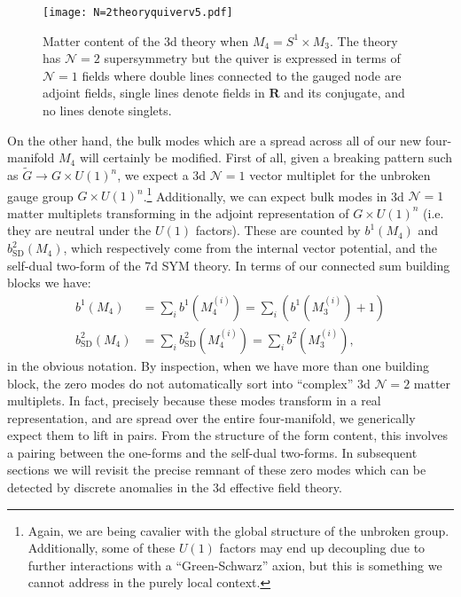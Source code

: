 \documentclass[12pt]{article}%
\numberwithin{equation}{section}
\renewcommand{\(}{\left(}
\renewcommand{\)}{\right)}
\renewcommand{\[}{\left[}
\renewcommand{\]}{\right]}
\begin{document}
\begin{figure}
\centering
\texttt{[image: N=2theoryquiverv5.pdf]}
\caption{Matter content of the 3d theory when $M_4=S^1 \times M_3$. The theory has $\mathcal{N}=2$ supersymmetry but the quiver is expressed in terms of $\mathcal{N}=1$ fields where double lines connected to the gauged node are adjoint fields, single lines denote fields in $\mathbf{R}$ and its conjugate, and no lines denote singlets.}
\label{fig:k=1}
\end{figure}



On the other hand, the bulk modes which are a spread across all of our new four-manifold $M_4$ will certainly be modified. First of all, given a breaking pattern such as $\widetilde{G} \rightarrow G \times U(1)^n $, we expect a 3d $\mathcal{N} = 1$ vector multiplet for the unbroken gauge group $G \times U(1)^n$.\footnote{Again, we are being cavalier with the global structure of the unbroken group. Additionally, some of these $U(1)$ factors may end up decoupling due to further interactions with a ``Green-Schwarz'' axion, but this is something we cannot address in the purely local context.} Additionally, we can expect bulk modes in 3d $\mathcal{N} = 1$ matter multiplets transforming in the adjoint representation of $G \times U(1)^n$ (i.e. they are neutral under the $U(1)$ factors). These are counted by $b^{1}(M_4)$ and $b^{2}_{\mathrm{SD}}(M_4)$, which respectively come from the internal vector potential, and the self-dual two-form of the 7d SYM theory. In terms of our connected sum building blocks we have:
\begin{align}
b^{1}(M_4) & = \underset{i}{\sum} b^{1}(M_4^{(i)}) = \underset{i}{\sum} (b^{1}(M_3^{(i)}) + 1) \\
b^{2}_{\mathrm{SD}}(M_4) & = \underset{i}{\sum} b^{2}_{\mathrm{SD}}(M_4^{(i)}) = \underset{i}{\sum} b^{2}(M_3^{(i)}) ,
\end{align}
in the obvious notation. By inspection, when we have more than one building block, the
zero modes do not automatically sort into ``complex'' 3d $\mathcal{N} = 2$ matter multiplets.
In fact, precisely because these modes transform in a real representation, and are spread over the entire four-manifold, we generically expect them to lift in pairs. From the structure of the form content, this involves a pairing between the one-forms and the self-dual two-forms. In subsequent sections we will revisit the precise remnant of these zero modes which can be detected by discrete anomalies in the 3d effective field theory.
\end{document}

